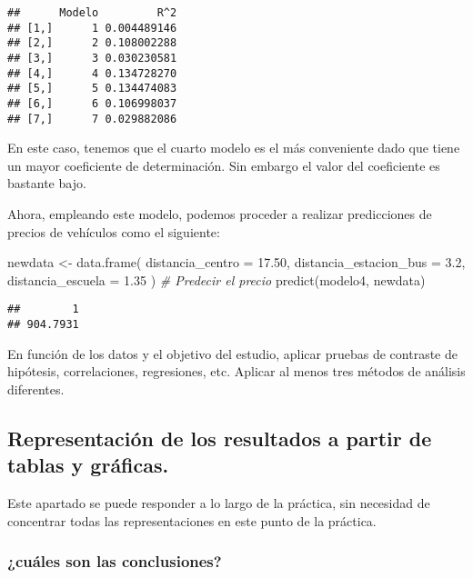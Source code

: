 \documentclass[
]{article}
\newenvironment{Shaded}{\begin{snugshade}}{\end{snugshade}}
\newcommand{\AttributeTok}[1]{\textcolor[rgb]{0.77,0.63,0.00}{#1}}
\newcommand{\CommentTok}[1]{\textcolor[rgb]{0.56,0.35,0.01}{\textit{#1}}}
\newcommand{\FloatTok}[1]{\textcolor[rgb]{0.00,0.00,0.81}{#1}}
\newcommand{\FunctionTok}[1]{\textcolor[rgb]{0.00,0.00,0.00}{#1}}
\newcommand{\NormalTok}[1]{#1}
\newcommand{\OtherTok}[1]{\textcolor[rgb]{0.56,0.35,0.01}{#1}}
\begin{document}
\begin{verbatim}
##      Modelo         R^2
## [1,]      1 0.004489146
## [2,]      2 0.108002288
## [3,]      3 0.030230581
## [4,]      4 0.134728270
## [5,]      5 0.134474083
## [6,]      6 0.106998037
## [7,]      7 0.029882086
\end{verbatim}

En este caso, tenemos que el cuarto modelo es el más conveniente dado
que tiene un mayor coeficiente de determinación. Sin embargo el valor
del coeficiente es bastante bajo.

Ahora, empleando este modelo, podemos proceder a realizar predicciones
de precios de vehículos como el siguiente:

\begin{Shaded}
\begin{Highlighting}[]
\NormalTok{newdata }\OtherTok{\textless{}{-}} \FunctionTok{data.frame}\NormalTok{(}
\AttributeTok{distancia\_centro =} \FloatTok{17.50}\NormalTok{,}
\AttributeTok{distancia\_estacion\_bus =} \FloatTok{3.2}\NormalTok{,}
\AttributeTok{distancia\_escuela =} \FloatTok{1.35}
\NormalTok{)}
\CommentTok{\# Predecir el precio}
\FunctionTok{predict}\NormalTok{(modelo4, newdata)}
\end{Highlighting}
\end{Shaded}

\begin{verbatim}
##        1 
## 904.7931
\end{verbatim}

En función de los datos y el objetivo del estudio, aplicar pruebas de
contraste de hipótesis, correlaciones, regresiones, etc. Aplicar al
menos tres métodos de análisis diferentes.

\hypertarget{representaciuxf3n-de-los-resultados-a-partir-de-tablas-y-gruxe1ficas.}{%
\subsection{Representación de los resultados a partir de tablas y
gráficas.}\label{representaciuxf3n-de-los-resultados-a-partir-de-tablas-y-gruxe1ficas.}}

Este apartado se puede responder a lo largo de la práctica, sin
necesidad de concentrar todas las representaciones en este punto de la
práctica.

\hypertarget{cuuxe1les-son-las-conclusiones}{%
\subsubsection{¿cuáles son las
conclusiones?}\label{cuuxe1les-son-las-conclusiones}}
\end{document}
